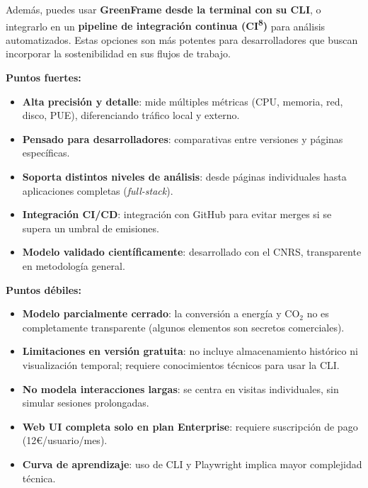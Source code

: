 \documentclass[12pt,a4paper]{report}
\begin{document}
Además, puedes usar \textbf{GreenFrame desde la terminal con su CLI}, o integrarlo en un \textbf{pipeline de integración continua (CI\textsuperscript{8})} para análisis automatizados. Estas opciones son más potentes para desarrolladores que buscan incorporar la sostenibilidad en sus flujos de trabajo.

\textbf{Puntos fuertes:}
\begin{itemize}
    \item \textbf{Alta precisión y detalle}: mide múltiples métricas (CPU, memoria, red, disco, PUE), diferenciando tráfico local y externo.
    \item \textbf{Pensado para desarrolladores}: comparativas entre versiones y páginas específicas.
    \item \textbf{Soporta distintos niveles de análisis}: desde páginas individuales hasta aplicaciones completas (\textit{full-stack}).
    \item \textbf{Integración CI/CD}: integración con GitHub para evitar merges si se supera un umbral de emisiones.
    \item \textbf{Modelo validado científicamente}: desarrollado con el CNRS, transparente en metodología general.
\end{itemize}

\textbf{Puntos débiles:}
\begin{itemize}
    \item \textbf{Modelo parcialmente cerrado}: la conversión a energía y CO$_2$ no es completamente transparente (algunos elementos son secretos comerciales).
    \item \textbf{Limitaciones en versión gratuita}: no incluye almacenamiento histórico ni visualización temporal; requiere conocimientos técnicos para usar la CLI.
    \item \textbf{No modela interacciones largas}: se centra en visitas individuales, sin simular sesiones prolongadas.
    \item \textbf{Web UI completa solo en plan Enterprise}: requiere suscripción de pago 
    (12€/usuario/mes).
    \item \textbf{Curva de aprendizaje}: uso de CLI y Playwright implica mayor complejidad técnica.
\end{itemize}
\end{document}
